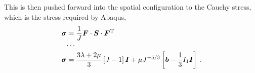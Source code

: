 \documentclass[10pt,letterpaper,oneside]{report}
\newcommand{\ten}[1]{\mbox{\boldmath $#1$}{}}
\newcommand{\scas}[1]{\mbox{{\scriptsize{${\rm{#1}}$}}}{}}
\begin{document}
This is then pushed forward into the spatial configuration to the Cauchy stress, which is the stress required by Abaqus, 
\begin{align}
\ten{\sigma} 
={}& \frac{1}{J} \ten{F} \cdot \ten{S} \cdot \ten{F}^{\scas{T}} 
\\
\cdots{}& \notag \\
\ten{\sigma} 
={}& \frac{3 \lambda + 2 \mu}{3} \left[ J - 1 \right] \ten{I} + \mu J^{-5/3} \left[ \ten{b} - \frac{1}{3} I_1 \ten{I} \right] \, . 
\end{align}
\end{document}
